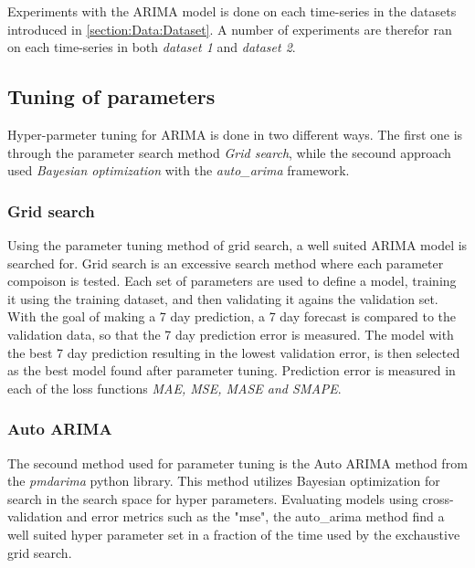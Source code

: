   Experiments with the ARIMA model is done on each time-series in the datasets introduced in \cref{section:Data:Dataset}.
  A number of experiments are therefor ran on each time-series in both \textit{dataset 1} and \textit{dataset 2}.


  \iffalse
    ARIMA models are first tuned on each time-series in order to make predicitons.
    The hyper-parmeters fond after the tuning is then used in order to created models capable of making predictions.
    The model attempts to make a 7 day ahead prediction.
  \fi

  \subsection{Tuning of parameters}
  Hyper-parmeter tuning for ARIMA is done in two different ways.
  The first one is through the parameter search method \textit{Grid search},
  while the secound approach used \textit{Bayesian optimization} with the \textit{auto\_arima} framework.

  \subsubsection*{Grid search}
  Using the parameter tuning method of grid search, a well suited ARIMA model is searched for.
  Grid search is an excessive search method where each parameter compoison is tested.
  Each set of parameters are  used to define a model, training it using the training dataset,
  and then validating it agains the validation set.
  With the goal of making a 7 day prediction, a 7 day forecast is compared to the validation data,
  so that the 7 day prediction error is measured.
  The model with the best 7 day prediction resulting in the lowest validation error,
  is then selected as the best model found after parameter tuning.
  Prediction error is measured in each of the loss functions \textit{MAE, MSE, MASE and SMAPE}.

  \subsubsection{Auto ARIMA}
  The secound method used for parameter tuning is the Auto ARIMA method from the \textit{pmdarima} python library.
  This method utilizes Bayesian optimization for search in the search space for hyper parameters.
  Evaluating models using cross-validation and error metrics such as the "mse",
  the auto\_arima method find a well suited hyper parameter set in a fraction of the time used by the exchaustive grid search.

